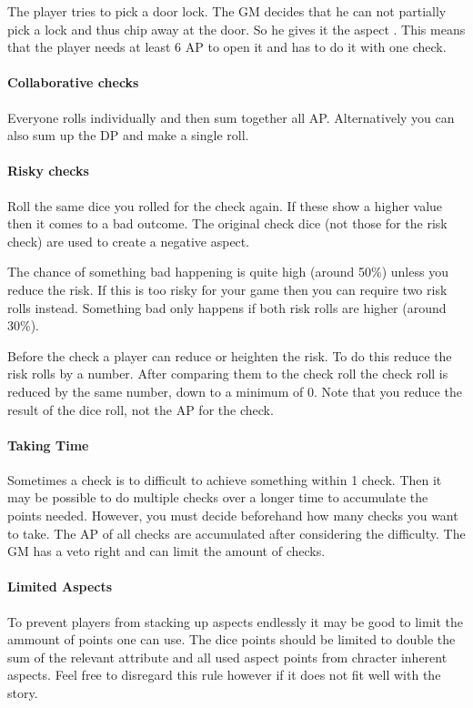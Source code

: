 \documentclass[11pt]{article}
\begin{document}
{\begin{pwexample}
The player tries to pick a door lock. The GM decides that he can not partially pick a lock and thus chip away at the door. So he gives it the aspect . This means that the player needs at least 6 AP to open it and has to do it with one check.
\end{pwexample}
\paragraph*{Collaborative checks}
\label{sec:orgc28c640}
Everyone rolls individually and then sum together all AP. Alternatively you can also sum up the DP and make a single roll.
\paragraph*{Risky checks}
\label{sec:org8b0c4a4}
Roll the same dice you rolled for the check again. If these show a higher value then it comes to a bad outcome. The original check dice (not those for the risk check) are used to create a negative aspect.

The chance of something bad happening is quite high (around 50\%) unless you reduce the risk. If this is too risky for your game then you can require two risk rolls instead. Something bad only happens if both risk rolls are higher (around 30\%). 

Before the check a player can reduce or heighten the risk. To do this reduce the risk rolls by a number. After comparing them to the check roll the check roll is reduced by the same number, down to a minimum of 0. Note that you reduce the result of the dice roll, not the AP for the check. 
\paragraph*{Taking Time}
\label{sec:orga00f425}
Sometimes a check is to difficult to achieve something within 1 check. Then it may be possible to do multiple checks over a longer time to accumulate the points needed. However, you must decide beforehand how many checks you want to take. The AP of all checks are accumulated after considering the difficulty. The GM has a veto right and can limit the amount of checks.
\paragraph*{Limited Aspects}
\label{sec:orgbd97b73}
To prevent players from stacking up aspects endlessly it may be good to limit the ammount of points one can use. The dice points should be limited to double the sum of the relevant attribute and all used aspect points from chracter inherent aspects. Feel free to disregard this rule however if it does not fit well with the story.
}
\end{document}
